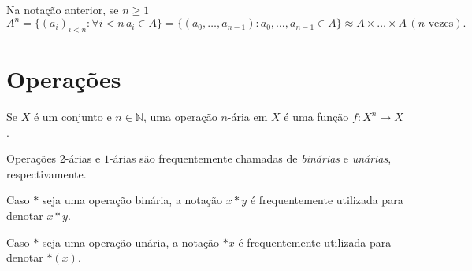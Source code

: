     Na notação anterior, se $n\geq 1$ $$A^n=\{(a_i)_{i<n}:\forall i<n\, a_i \in A\}=\{(a_0, \dots, a_{n-1}):a_0, \dots, a_{n-1}\in A\}\approx A\times \dots \times A \,(n \text{ vezes}).$$

    \section{Operações}

\begin{definition}
    Se $X$ é um conjunto e $n \in \mathbb N$, uma operação $n$-ária em $X$ é uma função $f:X^n\rightarrow X$.
\end{definition}

Operações $2$-árias e $1$-árias são frequentemente chamadas de \emph{binárias} e \emph{unárias}, respectivamente.

Caso $*$ seja uma operação binária, a notação $x*y$ é frequentemente utilizada para denotar $x*y$.

Caso $*$ seja uma operação unária, a notação $*x$ é frequentemente utilizada para denotar $*(x)$.
